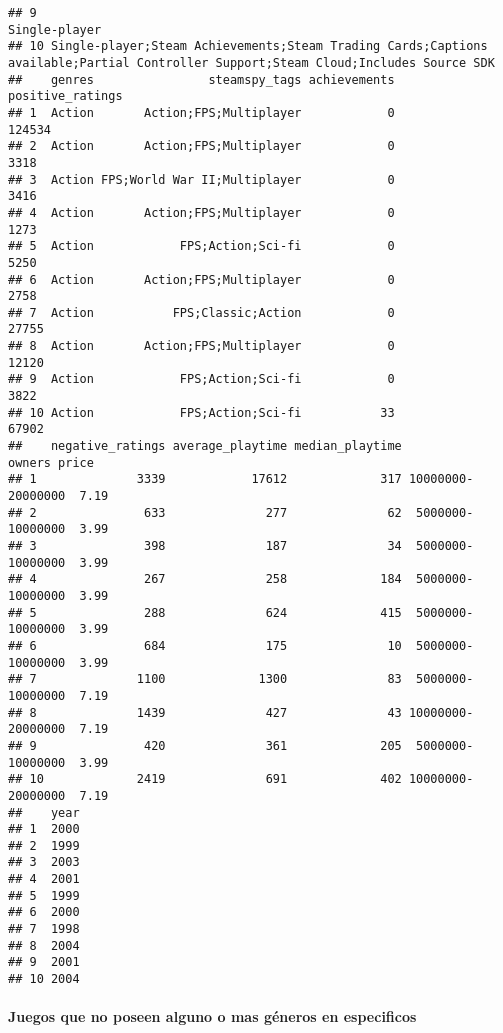 \documentclass[
]{article}
\begin{document}
\begin{verbatim}
## 9                                                                                                                       Single-player
## 10 Single-player;Steam Achievements;Steam Trading Cards;Captions available;Partial Controller Support;Steam Cloud;Includes Source SDK
##    genres                steamspy_tags achievements positive_ratings
## 1  Action       Action;FPS;Multiplayer            0           124534
## 2  Action       Action;FPS;Multiplayer            0             3318
## 3  Action FPS;World War II;Multiplayer            0             3416
## 4  Action       Action;FPS;Multiplayer            0             1273
## 5  Action            FPS;Action;Sci-fi            0             5250
## 6  Action       Action;FPS;Multiplayer            0             2758
## 7  Action           FPS;Classic;Action            0            27755
## 8  Action       Action;FPS;Multiplayer            0            12120
## 9  Action            FPS;Action;Sci-fi            0             3822
## 10 Action            FPS;Action;Sci-fi           33            67902
##    negative_ratings average_playtime median_playtime            owners price
## 1              3339            17612             317 10000000-20000000  7.19
## 2               633              277              62  5000000-10000000  3.99
## 3               398              187              34  5000000-10000000  3.99
## 4               267              258             184  5000000-10000000  3.99
## 5               288              624             415  5000000-10000000  3.99
## 6               684              175              10  5000000-10000000  3.99
## 7              1100             1300              83  5000000-10000000  7.19
## 8              1439              427              43 10000000-20000000  7.19
## 9               420              361             205  5000000-10000000  3.99
## 10             2419              691             402 10000000-20000000  7.19
##    year
## 1  2000
## 2  1999
## 3  2003
## 4  2001
## 5  1999
## 6  2000
## 7  1998
## 8  2004
## 9  2001
## 10 2004
\end{verbatim}

\hypertarget{juegos-que-no-poseen-alguno-o-mas-guxe9neros-en-especificos}{%
\paragraph{Juegos que no poseen alguno o mas géneros en
especificos}\label{juegos-que-no-poseen-alguno-o-mas-guxe9neros-en-especificos}}
\end{document}
